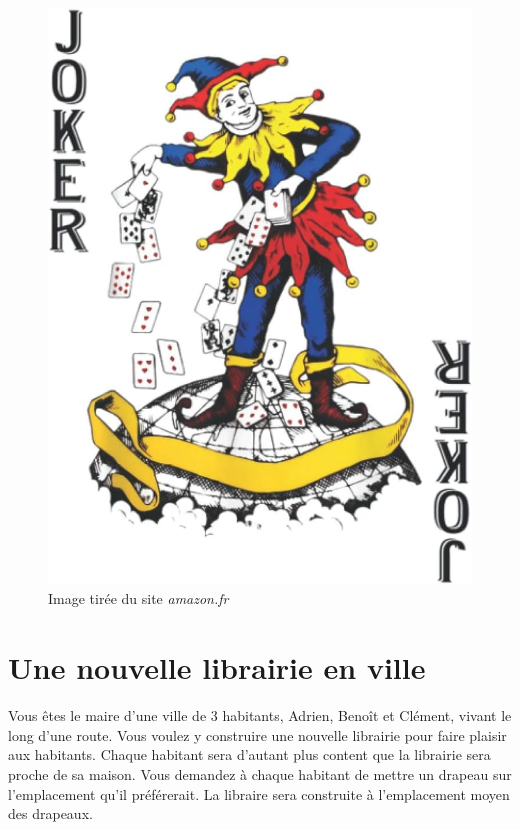 \documentclass[a4paper,10pt,oneside]{article}
\begin{document}
\vspace{3cm}
\begin{figure}[!ht]
  \centering
  \includegraphics[height=0.5\textheight]{figures/traders.jpg}
  \caption*{Image tirée du site \textit{amazon.fr}}
\end{figure}



\section{Une nouvelle librairie en ville}


Vous êtes le maire d'une ville de 3 habitants, Adrien, Benoît et Clément,  vivant le long d'une route.
Vous voulez y construire une nouvelle librairie pour faire plaisir aux habitants.
Chaque habitant sera d'autant plus content que la librairie sera proche de sa maison. 
Vous demandez à chaque habitant de mettre un drapeau sur l'emplacement qu'il préférerait.
La libraire sera construite à l'emplacement moyen des drapeaux.
\end{document}
